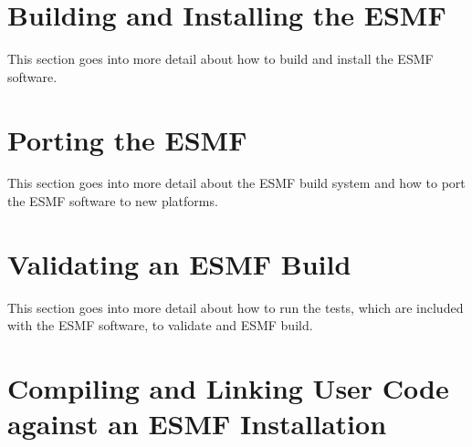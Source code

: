 
\setlength{\parskip}{1.5ex}
\setlength{\parindent}{0em}


\section{Building and Installing the ESMF}
\label{sec:TechOver}

This section goes into more detail about how to build and install the ESMF
software.




\section{Porting the ESMF}
\label{sec:TechOverPort}

This section goes into more detail about the ESMF build system and how to
port the ESMF software to new platforms.




\section{Validating an ESMF Build}
\label{sec:TechOver2}

This section goes into more detail about how to run the tests, which are
included with the ESMF software, to validate and ESMF build.




\section{Compiling and Linking User Code against an ESMF Installation}
\label{sec:Use}




%
